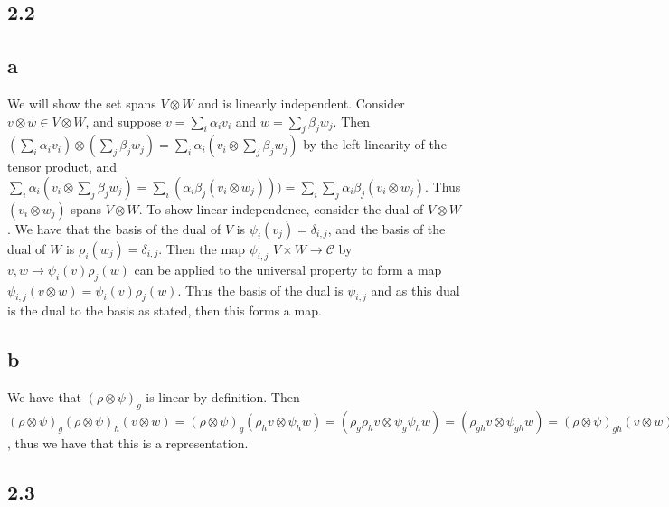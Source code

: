\documentclass[]{article}
\begin{document}
\subsection*{2.2}
\subsection*{a}
We will show the set spans $V \otimes W$ and is linearly independent.
Consider $v \otimes w \in V \otimes W$, and suppose $v = \sum_i \alpha_i v_i$ and $w = \sum_j \beta_j w_j$. Then $ (\sum_i \alpha_i v_i) \otimes (\sum_j \beta_j w_j) = \sum_i \alpha_i (v_i \otimes \sum_j \beta_j w_j)$ by the left linearity of the tensor product, and $\sum_i \alpha_i (v_i \otimes \sum_j \beta_j w_j) = \sum_i (\alpha_i \beta_j (v_i \otimes w_j))) = \sum_i \sum_j \alpha_i \beta_j (v_i \otimes w_j)$. Thus $(v_i \otimes w_j)$ spans $V \otimes W$. To show linear independence, consider the dual of $V \otimes W$. We have that the basis of the dual of $V$ is $\psi_i(v_j) = \delta_{i, j}$, and the basis of the dual of $W$ is $\rho_i(w_j) = \delta_{i,j}$. Then the map $\psi_{i,j}$ $V \times W \rightarrow \mathcal{C}$ by $v, w \rightarrow \psi_i(v) \rho_j(w)$ can be applied to the universal property to form a map $\psi_{i,j}(v \otimes w) = \psi_i(v) \rho_j(w)$. Thus the basis of the dual is $\psi_{i,j}$ and as this dual is the dual to the basis as stated, then this forms a map. 
\subsection*{b}
We have that $(\rho \otimes \psi)_g$ is linear by definition. Then  $(\rho \otimes \psi)_g (\rho \otimes \psi)_h (v \otimes w) = (\rho \otimes \psi)_g (\rho_h v \otimes \psi_h w) = (\rho_g \rho_h v \otimes \psi_g \psi_h w) = (\rho_{gh} v \otimes \psi_{gh} w) = (\rho \otimes \psi)_{gh} (v \otimes w)$, thus we have that this is a representation.

\subsection{2.3}
\end{document}
